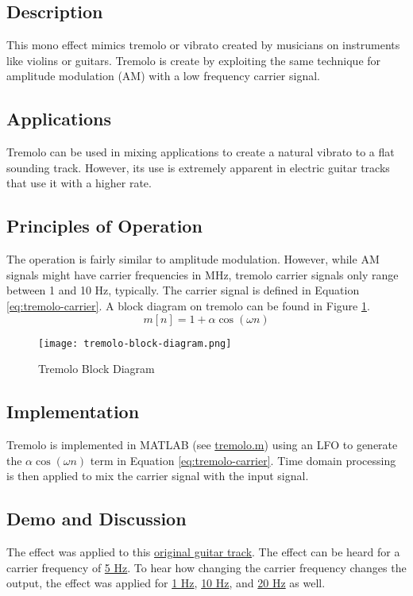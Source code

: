 \subsection{Description}
This mono effect mimics tremolo or vibrato created by musicians on instruments like violins or guitars. Tremolo is create by exploiting the same technique for amplitude modulation (AM) with a low frequency carrier signal.

\subsection{Applications}
Tremolo can be used in mixing applications to create a natural vibrato to a flat sounding track. However, its use is extremely apparent in electric guitar tracks that use it with a higher rate.

\subsection{Principles of Operation}
The operation is fairly similar to amplitude modulation. However, while AM signals might have carrier frequencies in MHz, tremolo carrier signals only range between 1 and 10 Hz, typically. The carrier signal is defined in Equation \ref{eq:tremolo-carrier}. A block diagram on tremolo can be found in Figure \ref{fig:tremolo-block-diagram}.
\begin{equation}
    m[n] = 1 + \alpha \cos(\omega n)
    \label{eq:tremolo-carrier}
\end{equation}
\begin{figure}[ht]
    \centering
    \texttt{[image: tremolo-block-diagram.png]}
    \caption{Tremolo Block Diagram}
    \label{fig:tremolo-block-diagram}
\end{figure}

\subsection{Implementation}
Tremolo is implemented in MATLAB (see \href{run:../tremolo.m}{tremolo.m}) using an LFO to generate the $\alpha \cos(\omega n)$ term in Equation \ref{eq:tremolo-carrier}. Time domain processing is then applied to mix the carrier signal with the input signal.

\subsection{Demo and Discussion}
The effect was applied to this \href{run:../InputAudio/22-004 Original Guitar.wav}{original guitar track}. The effect can be heard for a carrier frequency of \href{run:../OutputAudio/tremolo_22-004 Original Guitar_{depth=1}{f_LFO=5Hz}.wav}{5 Hz}. To hear how changing the carrier frequency changes the output, the effect was applied for \href{run:../OutputAudio/tremolo_22-004 Original Guitar_{depth=1}{f_LFO=1Hz}.wav}{1 Hz}, \href{run:../OutputAudio/tremolo_22-004 Original Guitar_{depth=1}{f_LFO=10Hz}.wav}{10 Hz}, and \href{run:../OutputAudio/tremolo_22-004 Original Guitar_{depth=1}{f_LFO=20Hz}.wav}{20 Hz} as well.

